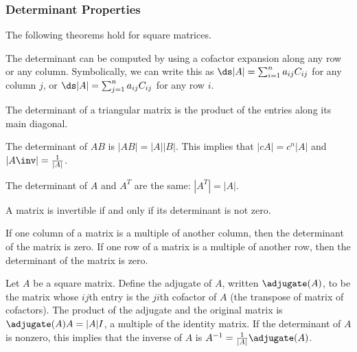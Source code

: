 \subsubsection{Determinant Properties}

The following theorems hold for square matrices.

\begin{theorem}
The determinant can be computed by using a cofactor expansion along any row or any column. Symbolically, we can write this as $\ds |A| = \sum_{i=1}^n a_{ij} C_{ij}$ for any column $j$,  or $\ds |A| = \sum_{j=1}^n a_{ij} C_{ij}$ for any row $i$.
\end{theorem}


\begin{theorem}\label{thm det triangular}
The determinant of a triangular matrix is the product of the entries along its main diagonal.
\end{theorem}

\begin{theorem}\label{thm det product}
The determinant of $AB$ is $|AB|=|A||B|$. This implies that $|cA|=c^n|A|$ and $|A\inv|=\frac{1}{|A|}$. 
\end{theorem}

\begin{theorem}\label{thm det transpose}
The determinant of $A$ and $A^T$ are the same: $|A^T| = |A|$.
\end{theorem}

\begin{theorem}\label{thm det zero}
A matrix is invertible if and only if its determinant is not zero.
\end{theorem}

\begin{theorem}\label{thm det multiple columns}
If one column of a matrix is a multiple of another column, then the determinant of the matrix is zero. 
If one row of a matrix is a multiple of another row, then the determinant of the matrix is zero. 
\end{theorem}

\begin{theorem}\label{thm adjugate}
Let $A$ be a square matrix. Define the adjugate of $A$, written $\adjugate(A)$, to be the matrix whose $ij$th entry is the $ji$th cofactor of $A$ (the transpose of matrix of cofactors).  
The product of the adjugate and the original matrix is $\adjugate(A) A = |A|I$, a multiple of the identity matrix. 
If the determinant of $A$ is nonzero, this implies that the inverse of $A$ is $A^{-1}=\frac{1}{|A|}\adjugate(A)$.
\end{theorem}




